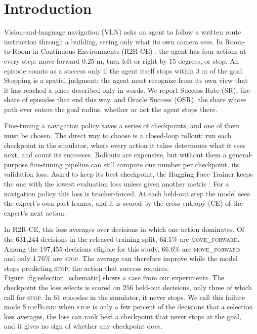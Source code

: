 \section{Introduction}

Vision-and-language navigation (VLN) asks an agent to follow a written route instruction through a
building, seeing only what its own camera sees. In Room-to-Room in Continuous Environments (R2R-CE)
\citep{anderson2018r2r,krantz2020beyond}, the agent has four actions at every step: move forward
0.25 m, turn left or right by 15 degrees, or stop. An episode counts as a success only if the agent
itself stops within 3 m of the goal. Stopping is a spatial judgment: the agent must recognize from
its own view that it has reached a place described only in words. We report Success Rate (SR), the
share of episodes that end this way, and Oracle Success (OSR), the share whose path ever enters the
goal radius, whether or not the agent stops there.

Fine-tuning a navigation policy saves a series of checkpoints, and one of them must be chosen. The
direct way to choose is a closed-loop rollout: run each checkpoint in the simulator, where every
action it takes determines what it sees next, and count its successes. Rollouts are expensive, but
without them a general-purpose fine-tuning pipeline can still compute one number per checkpoint, its
validation loss. Asked to keep its best checkpoint, the Hugging Face Trainer keeps the one with the
lowest evaluation loss unless given another metric \citep{hf2026trainer}. For a navigation policy
this loss is teacher-forced. At each held-out step the model sees the expert's own past frames, and
it is scored by the cross-entropy (CE) of the expert's next action.

In R2R-CE, this loss averages over decisions in which one action dominates. Of the 631{,}244
decisions in the released training split, $64.1\%$ are \textsc{move\_forward}. Among the 197{,}455
decisions eligible for this study, $66.6\%$ are \textsc{move\_forward} and only $1.76\%$ are
\textsc{stop}. The average can therefore improve while the model stops predicting \textsc{stop}, the
action that success requires. Figure~\ref{fig:selection_schematic} shows a case from our experiments.
The checkpoint the loss selects is scored on $256$ held-out decisions, only three of which call for
\textsc{stop}. In $61$ episodes in the simulator, it never stops. We call this failure mode
\textsc{StopBlind}: when \textsc{stop} is only a few percent of the decisions that a selection loss
averages, the loss can rank best a checkpoint that never stops at the goal, and it gives no sign of
whether any checkpoint does.

